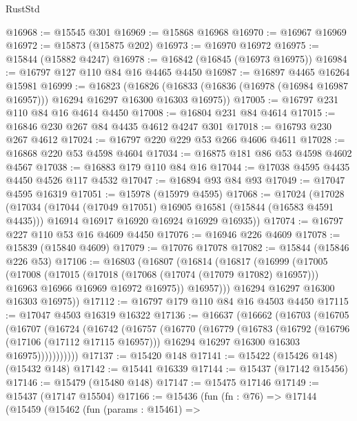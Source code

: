 \begin{lexlean}{RustStd}
\begin{coremodule}
@16968 := @15545 @301
@16969 := @15868 @16968
@16970 := @16967 @16969
@16972 := @15873 (@15875 @202)
@16973 := @16970 @16972
@16975 := @15844 (@15882 @4247)
@16978 := @16842 (@16845 (@16973 @16975))
@16984 := @16797 @127 @110 @84 @16 @4465 @4450
@16987 := @16897 @4465 @16264 @15981
@16999 := @16823
    (@16826 (@16833 (@16836 (@16978 (@16984 @16987 @16957))) @16294 @16297 @16300 @16303 @16975))
@17005 := @16797 @231 @110 @84 @16 @4614 @4450
@17008 := @16804 @231 @84 @4614
@17015 := @16846 @230 @267 @84 @4435 @4612 @4247 @301
@17018 := @16793 @230 @267 @4612
@17024 := @16797 @220 @229 @53 @266 @4606 @4611
@17028 := @16868 @220 @53 @4598 @4604
@17034 := @16875 @181 @86 @53 @4598 @4602 @4567
@17038 := @16883 @179 @110 @84 @16
@17044 := @17038 @4595 @4435 @4450 @4526 @117 @4532
@17047 := @16894 @93 @84 @93
@17049 := @17047 @4595 @16319
@17051 := @15978 (@15979 @4595)
@17068 := @17024
    (@17028
      (@17034
        (@17044 (@17049 @17051) @16905 @16581 (@15844 (@16583 @4591 @4435)))
        @16914
        @16917
        @16920
        @16924
        @16929
        @16935))
@17074 := @16797 @227 @110 @53 @16 @4609 @4450
@17076 := @16946 @226 @4609
@17078 := @15839 (@15840 @4609)
@17079 := @17076 @17078
@17082 := @15844 (@15846 @226 @53)
@17106 := @16803
    (@16807
      (@16814
        (@16817
          (@16999
            (@17005
              (@17008
                (@17015
                  (@17018 (@17068 (@17074 (@17079 @17082) @16957)))
                  @16963
                  @16966
                  @16969
                  @16972
                  @16975))
              @16957)))
        @16294
        @16297
        @16300
        @16303
        @16975))
@17112 := @16797 @179 @110 @84 @16 @4503 @4450
@17115 := @17047 @4503 @16319 @16322
@17136 := @16637
    (@16662
      (@16703
        (@16705
          (@16707
            (@16724
              (@16742
                (@16757
                  (@16770
                    (@16779
                      (@16783
                        (@16792
                          (@16796 (@17106 (@17112 @17115 @16957)))
                          @16294
                          @16297
                          @16300
                          @16303
                          @16975)))))))))))
@17137 := @15420 @148
@17141 := @15422 (@15426 @148) (@15432 @148)
@17142 := @15441 @16339
@17144 := @15437 (@17142 @15456)
@17146 := @15479 (@15480 @148)
@17147 := @15475 @17146
@17149 := @15437 (@17147 @15504)
@17166 := @15436
    (fun (fn : @76) =>
    @17144
      (@15459
        (@15462
          (fun (params : @15461) =>

\end{coremodule}
\end{lexlean}
